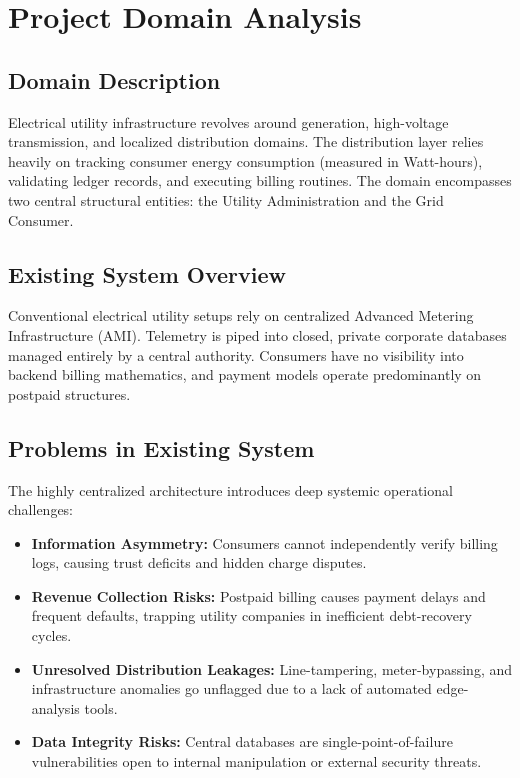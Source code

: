 
\section{Project Domain Analysis}

\subsection{Domain Description}
Electrical utility infrastructure revolves around generation, high-voltage transmission, and localized distribution domains. The distribution layer relies heavily on tracking consumer energy consumption (measured in Watt-hours), validating ledger records, and executing billing routines. The domain encompasses two central structural entities: the Utility Administration and the Grid Consumer.

\subsection{Existing System Overview}
Conventional electrical utility setups rely on centralized Advanced Metering Infrastructure (AMI). Telemetry is piped into closed, private corporate databases managed entirely by a central authority. Consumers have no visibility into backend billing mathematics, and payment models operate predominantly on postpaid structures.

\subsection{Problems in Existing System}

The highly centralized architecture introduces deep systemic operational challenges:

\begin{itemize}[leftmargin=*]
\item \textbf{Information Asymmetry:} Consumers cannot independently verify billing logs, causing trust deficits and hidden charge disputes.

\item \textbf{Revenue Collection Risks:} Postpaid billing causes payment delays and frequent defaults, trapping utility companies in inefficient debt-recovery cycles.

\item \textbf{Unresolved Distribution Leakages:} Line-tampering, meter-bypassing, and infrastructure anomalies go unflagged due to a lack of automated edge-analysis tools.

\item \textbf{Data Integrity Risks:} Central databases are single-point-of-failure vulnerabilities open to internal manipulation or external security threats.

\end{itemize}

